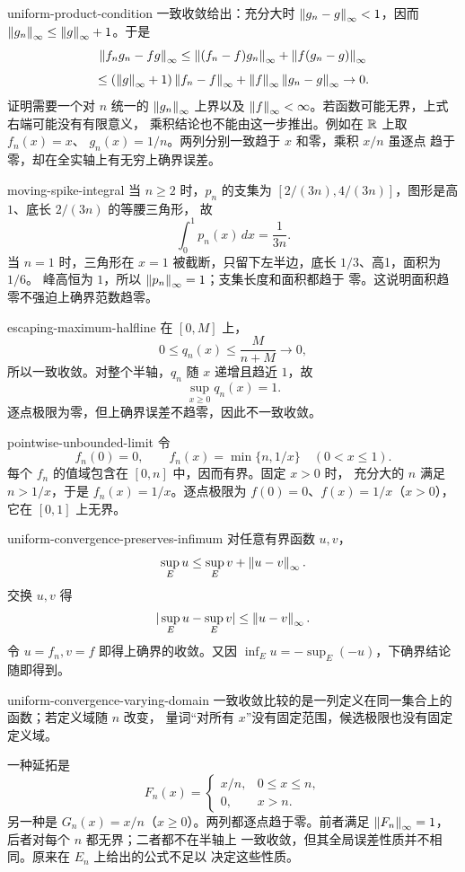 \begin{solution}{uniform-product-condition}
一致收敛给出：充分大时
\(\left\lVert g_n-g\right\rVert_\infty<1\)，因而
\(\left\lVert g_n\right\rVert_\infty\le\left\lVert g\right\rVert_\infty+1\)。于是
\[
 \left\lVert f_ng_n-fg\right\rVert_\infty
 \le\left\lVert(f_n-f)g_n\right\rVert_\infty+\left\lVert f(g_n-g)\right\rVert_\infty
\]
\[
 \le(\left\lVert g\right\rVert_\infty+1)\left\lVert f_n-f\right\rVert_\infty
   +\left\lVert f\right\rVert_\infty\left\lVert g_n-g\right\rVert_\infty\to0.
\]
证明需要一个对 \(n\) 统一的 \(\left\lVert g_n\right\rVert_\infty\) 上界以及
\(\left\lVert f\right\rVert_\infty<\infty\)。若函数可能无界，上式右端可能没有有限意义，
乘积结论也不能由这一步推出。例如在 \(\mathbb{R}\) 上取 \(f_n(x)=x\)、
\(g_n(x)=1/n\)。两列分别一致趋于 \(x\) 和零，乘积 \(x/n\) 虽逐点
趋于零，却在全实轴上有无穷上确界误差。
\end{solution}

\begin{solution}{moving-spike-integral}
当 \(n\ge2\) 时，\(p_n\) 的支集为
\([2/(3n),4/(3n)]\)，图形是高 \(1\)、底长 \(2/(3n)\) 的等腰三角形，
故
\[
 \int_0^1p_n(x)\,dx=\frac1{3n}.
\]
当 \(n=1\) 时，三角形在 \(x=1\) 被截断，只留下左半边，底长
\(1/3\)、高1，面积为 \(1/6\)。
峰高恒为 \(1\)，所以 \(\left\lVert p_n\right\rVert_\infty=1\)；支集长度和面积都趋于
零。这说明面积趋零不强迫上确界范数趋零。
\end{solution}

\begin{solution}{escaping-maximum-halfline}
在 \([0,M]\) 上，
\[
 0\le q_n(x)\le\frac{M}{n+M}\to0,
\]
所以一致收敛。对整个半轴，\(q_n\) 随 \(x\) 递增且趋近 \(1\)，故
\[
 \sup_{x\ge0}q_n(x)=1.
\]
逐点极限为零，但上确界误差不趋零，因此不一致收敛。
\end{solution}

\begin{solution}{pointwise-unbounded-limit}
令
\[
 f_n(0)=0,\qquad
 f_n(x)=\min\{n,1/x\}\quad(0<x\le1).
\]
每个 \(f_n\) 的值域包含在 \([0,n]\) 中，因而有界。固定 \(x>0\) 时，
充分大的 \(n\) 满足 \(n>1/x\)，于是 \(f_n(x)=1/x\)。逐点极限为
\(f(0)=0\)、\(f(x)=1/x\)（\(x>0\)），它在 \([0,1]\) 上无界。
\end{solution}

\begin{solution}{uniform-convergence-preserves-infimum}
对任意有界函数 \(u,v\)，
\[
 \sup_Eu\le\sup_Ev+\left\lVert u-v\right\rVert_\infty.
\]
交换 \(u,v\) 得
\[
 |\sup_Eu-\sup_Ev|\le\left\lVert u-v\right\rVert_\infty.
\]
令 \(u=f_n,v=f\) 即得上确界的收敛。又因
\(\inf_Eu=-\sup_E(-u)\)，下确界结论随即得到。
\end{solution}

\begin{solution}{uniform-convergence-varying-domain}
一致收敛比较的是一列定义在同一集合上的函数；若定义域随 \(n\) 改变，
量词“对所有 \(x\)”没有固定范围，候选极限也没有固定定义域。

一种延拓是
\[
 F_n(x)=
 \begin{cases}x/n,&0\le x\le n,\\0,&x>n.\end{cases}
\]
另一种是 \(G_n(x)=x/n\)（\(x\ge0\)）。两列都逐点趋于零。前者满足
\(\left\lVert F_n\right\rVert_\infty=1\)，后者对每个 \(n\) 都无界；二者都不在半轴上
一致收敛，但其全局误差性质并不相同。原来在 \(E_n\) 上给出的公式不足以
决定这些性质。
\end{solution}

